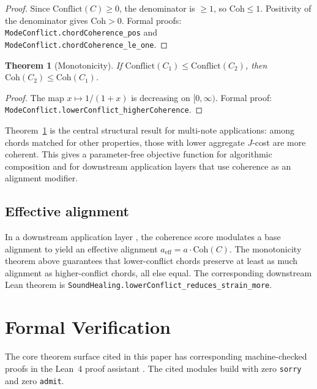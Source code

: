 \documentclass[11pt,a4paper]{article}
\newtheorem{theorem}{Theorem}
\begin{document}
\begin{proof}
Since $\mathrm{Conflict}(C)\geq 0$, the denominator is $\geq 1$, so
$\mathrm{Coh}\leq 1$.  Positivity of the denominator gives
$\mathrm{Coh}>0$.  Formal proofs:
\texttt{ModeConflict.chordCoherence\_pos} and
\texttt{ModeConflict.chordCoherence\_le\_one}.
\end{proof}

\begin{theorem}[Monotonicity]
\label{thm:mono}
If $\mathrm{Conflict}(C_1)\leq\mathrm{Conflict}(C_2)$, then
$\mathrm{Coh}(C_2)\leq\mathrm{Coh}(C_1)$.
\end{theorem}

\begin{proof}
The map $x\mapsto 1/(1+x)$ is decreasing on $[0,\infty)$.  Formal
proof: \texttt{ModeConflict.lowerConflict\_higherCoherence}.
\end{proof}

\noindent Theorem~\ref{thm:mono} is the central structural result
for multi-note applications: among chords matched for other
properties, those with lower aggregate $J$-cost are more coherent.
This gives a parameter-free objective function for algorithmic
composition and for downstream application layers that use coherence as
an alignment modifier.

\subsection{Effective alignment}

In a downstream application layer \citep{washburn2026envelope}, the
coherence score modulates a base alignment to yield an effective
alignment $a_{\mathrm{eff}}=a\cdot\mathrm{Coh}(C)$.  The monotonicity
theorem above guarantees that lower-conflict chords preserve at least as
much alignment as higher-conflict chords, all else equal.  The
corresponding downstream Lean theorem is
\texttt{SoundHealing.lowerConflict\_reduces\_strain\_more}.

\section{Formal Verification}
\label{sec:lean}

The core theorem surface cited in this paper has corresponding
machine-checked proofs in the Lean~4 proof assistant \citep{moura2021}.
The cited modules build with zero \texttt{sorry} and zero
\texttt{admit}.
\end{document}
